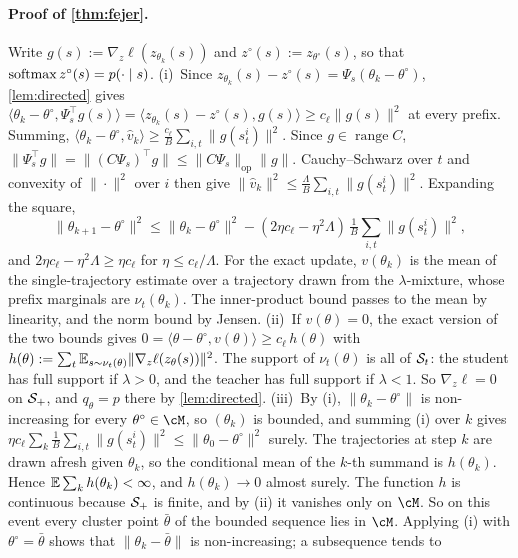 \paragraph{Proof of \cref{thm:fejer}.}
Write $g(s):=\nabla_z\ell(z_{\theta_k}(s))$ and $z^\circ(s):=z_{\theta^\circ}(s)$, so that $\operatorname{softmax} z^\circ(s)=p(\cdot\mid s)$.
(i)~Since $z_{\theta_k}(s)-z^\circ(s)=\Psi_s(\theta_k-\theta^\circ)$, \cref{lem:directed} gives
$\langle\theta_k-\theta^\circ,\Psi_s^\top g(s)\rangle=\langle z_{\theta_k}(s)-z^\circ(s),g(s)\rangle\ge c_\ell\|g(s)\|^2$ at every prefix. Summing,
$\langle\theta_k-\theta^\circ,\hat v_k\rangle\ge\frac{c_\ell}B\sum_{i,t}\|g(s^i_t)\|^2$. Since $g\in\operatorname{range}C$, $\|\Psi_s^\top g\|=\|(C\Psi_s)^\top g\|\le\|C\Psi_s\|_{\mathrm{op}}\|g\|$.
Cauchy--Schwarz over $t$ and convexity of $\|\cdot\|^2$ over $i$ then give $\|\hat v_k\|^2\le\frac\Lambda B\sum_{i,t}\|g(s^i_t)\|^2$. Expanding the square,
\[
\|\theta_{k+1}-\theta^\circ\|^2\le\|\theta_k-\theta^\circ\|^2-(2\eta c_\ell-\eta^2\Lambda)\,\tfrac1B\textstyle\sum_{i,t}\|g(s^i_t)\|^2 ,
\]
and $2\eta c_\ell-\eta^2\Lambda\ge\eta c_\ell$ for $\eta\le c_\ell/\Lambda$. For the exact update, $v(\theta_k)$ is the mean of the single-trajectory estimate over a
trajectory drawn from the $\lambda$-mixture, whose prefix marginals are $\nu_t(\theta_k)$. The inner-product bound passes to the mean
by linearity, and the norm bound by Jensen. (ii)~If $v(\theta)=0$, the exact version of the two bounds gives
$0=\langle\theta-\theta^\circ,v(\theta)\rangle\ge c_\ell\,h(\theta)$ with $h(\theta):=\sum_t\mathbb{E}_{s\sim\nu_t(\theta)}\|\nabla_z\ell(z_\theta(s))\|^2$. The support of $\nu_t(\theta)$ is all of
$\mathcal{S}_t$: the student has full support if $\lambda>0$, and the teacher has full support if $\lambda<1$. So $\nabla_z\ell=0$ on $\mathcal{S}_+$,
and $q_\theta=p$ there by \cref{lem:directed}.
(iii)~By (i), $\|\theta_k-\theta^\circ\|$ is non-increasing for every $\theta^\circ\in\cM$, so $(\theta_k)$ is bounded, and summing (i) over $k$ gives
$\eta c_\ell\sum_k\frac1B\sum_{i,t}\|g(s^i_t)\|^2\le\|\theta_0-\theta^\circ\|^2$ surely. The trajectories at step $k$ are drawn afresh given $\theta_k$, so the
conditional mean of the $k$-th summand is $h(\theta_k)$. Hence $\mathbb{E}\sum_kh(\theta_k)<\infty$, and $h(\theta_k)\to0$ almost surely. The function $h$ is
continuous because $\mathcal{S}_+$ is finite, and by (ii) it vanishes only on $\cM$. So on this event every cluster point $\bar\theta$ of the
bounded sequence lies in $\cM$. Applying (i) with $\theta^\circ=\bar\theta$ shows that $\|\theta_k-\bar\theta\|$ is non-increasing; a subsequence tends to

